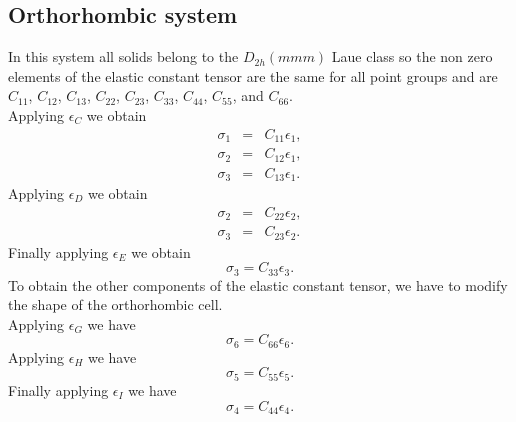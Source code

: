 \documentclass[12pt,a4paper]{article}
\begin{document}
\subsection{\color{web-blue}Orthorhombic system}
In this system all solids belong to the $D_{2h} (mmm)$ Laue class so
the non zero elements of the elastic constant tensor are the same for all 
point groups and are
$C_{11}$, $C_{12}$, $C_{13}$, $C_{22}$, $C_{23}$,
$C_{33}$, $C_{44}$, $C_{55}$, and $C_{66}$. \\
Applying $\epsilon_C$ we obtain
\begin{eqnarray}
\sigma_1&=&C_{11} \epsilon_1,  \\
\sigma_2&=&C_{12} \epsilon_1,  \\
\sigma_3&=&C_{13} \epsilon_1.
\end{eqnarray}
Applying $\epsilon_D$ we obtain
\begin{eqnarray}
\sigma_2&=&C_{22} \epsilon_2,  \\
\sigma_3&=&C_{23} \epsilon_2.
\end{eqnarray}
Finally applying $\epsilon_E$ we obtain
\begin{equation}
\sigma_3=C_{33} \epsilon_3.
\end{equation}
To obtain the other components of the elastic constant tensor,
we have to modify the shape of the orthorhombic cell. \\
Applying $\epsilon_G$ we have
\begin{equation}
\sigma_6=C_{66} \epsilon_6.
\end{equation}
Applying $\epsilon_H$ we have
\begin{equation}
\sigma_5=C_{55} \epsilon_5.
\end{equation}
Finally applying $\epsilon_I$ we have
\begin{equation}
\sigma_4=C_{44} \epsilon_4.
\end{equation}
\end{document}
